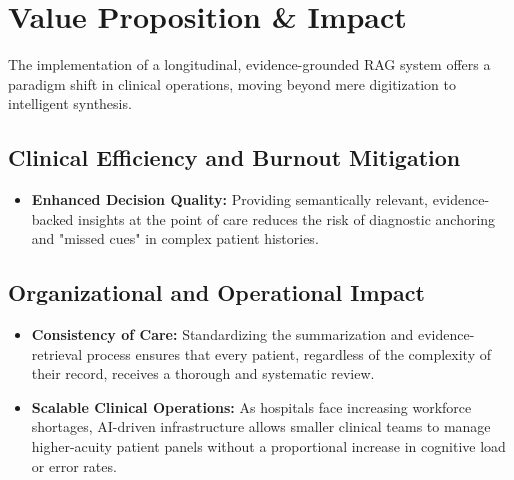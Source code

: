 \section{Value Proposition \& Impact}
\label{sec:impact}
The implementation of a longitudinal, evidence-grounded RAG system offers a paradigm shift in clinical operations, moving beyond mere digitization to intelligent synthesis.

\subsection{Clinical Efficiency and Burnout Mitigation}
\begin{itemize}

    \item \textbf{Enhanced Decision Quality:} Providing semantically relevant, evidence-backed insights at the point of care reduces the risk of diagnostic anchoring and "missed cues" in complex patient histories.
\end{itemize}



\subsection{Organizational and Operational Impact}
\begin{itemize}
    \item \textbf{Consistency of Care:} Standardizing the summarization and evidence-retrieval process ensures that every patient, regardless of the complexity of their record, receives a thorough and systematic review.
    \item \textbf{Scalable Clinical Operations:} As hospitals face increasing workforce shortages, AI-driven infrastructure allows smaller clinical teams to manage higher-acuity patient panels without a proportional increase in cognitive load or error rates.
\end{itemize}
